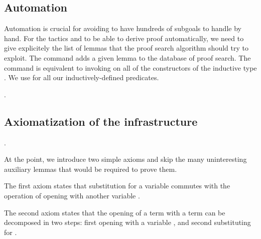\documentclass[12pt]{report}
\begin{document}
\subsection{Automation}



 Automation is crucial for avoiding to have hundreds of subgoals to
    handle by hand. For the tactics  and  to be able to
    derive proof automatically, we need to give explicitely the list of
    lemmas that the proof search algorithm should try to exploit.
    The command    adds a given lemma to the database
    of proof search. The command    is equivalent
    to invoking   on all of the constructors of the inductive
    type . We use   for all our inductively-defined
    predicates.

\begin{coqdoccode}
\coqdocemptyline
\coqdocnoindent
{}   .\coqdoceol
\coqdocemptyline
\end{coqdoccode}
\subsection{Axiomatization of the infrastructure}


\begin{coqdoccode}
\coqdocemptyline
\coqdocnoindent
{} .\coqdoceol
\coqdocemptyline
\end{coqdoccode}
At the point, we introduce two simple axioms and skip the many
    uninteresting auxiliary lemmas that would be required to prove them.


    The first axiom states that substitution for a variable  
    commutes with the operation of opening with another variable .


    The second axiom states that the opening of a term  with a 
    term  can be decomposed in two steps: first opening  with
    a variable , and second substituting  for .
\end{document}

